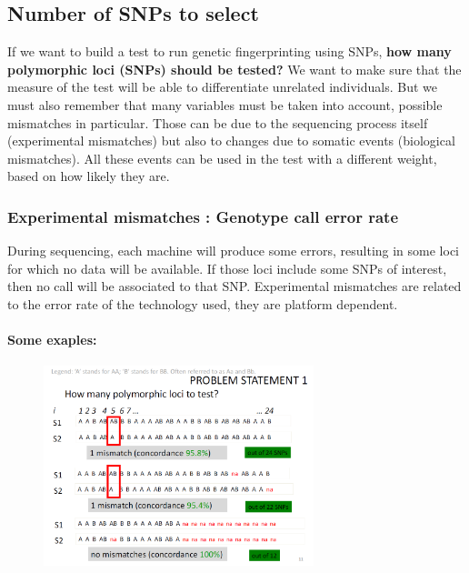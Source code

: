 \subsection*{Number of SNPs to select} 

If we want to build a test to run genetic fingerprinting using SNPs, \textbf{how many polymorphic loci (SNPs) should be tested?} 
We want to make sure that the measure of the test will be able to differentiate unrelated individuals. 
But we must also remember that many variables must be taken into account, possible mismatches in particular. Those can be due to the sequencing process itself (experimental mismatches) but also to changes due to somatic events (biological mismatches). All these events can be used in the test with a different weight, based on how likely they are. 


\subsubsection*{Experimental mismatches : Genotype call error rate}

During sequencing, each machine will produce some errors, resulting in some loci for which no data will be available. If those loci include some SNPs of interest, then no call will be associated to that SNP. 
Experimental mismatches are related to the error rate of the technology used, they are platform dependent. 

\paragraph*{Some exaples:}

\begin{figure}
	\centering
	\includegraphics[width=0.7\textwidth]{Images/SNP_number.PNG}
	\caption{\label{fig:SNP_number}}
\end{figure}

